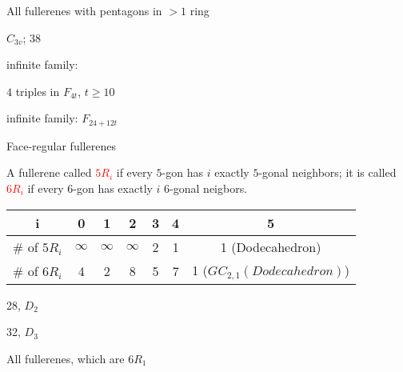 \documentclass[%
pdf,
colorBG,
slideColor,
]{prosper}
\begin{document}
\begin{slide}{All fullerenes with pentagons in $>1$ ring}

\begin{center}
\begin{minipage}{3.5cm}
\centering
{}\par
$C_{3v}$; 38
\end{minipage}
\begin{minipage}{3.5cm}
\centering
{}\par
infinite family:\par
$4$ triples 
in $F_{4t}$, $t\ge 10$
\end{minipage}
\begin{minipage}{3.5cm}
\centering
{}\par
infinite family:
$F_{24+12t}$\par
\end{minipage}
\end{center}

\end{slide}



\begin{slide}{Face-regular fullerenes}

A fullerene called \textcolor{red}{$5R_i$} if every $5$-gon has $i$ 
exactly $5$-gonal 
neighbors; it is called \textcolor{red}{$6R_i$} if every $6$-gon has
exactly $i$ $6$-gonal neigbors.

\begin{center}
\begin{tabular}{|c|c|c|c|c|c|c|}
\hline
i             &0        &1        &2        &3  & 4  &     5\\
\hline
\# of $5R_i$  &$\infty$ &$\infty$ &$\infty$ &2  & 1  &     1 (Dodecahedron)\\
\hline
\# of $6R_i$  &4        &2        &8        &5  & 7  &     1 ($GC_{2,1}(Dodecahedron)$)\\
\hline
\end{tabular}
\end{center}

\begin{center}
\begin{minipage}{5cm}
\centering
{}\par
28, $D_2$
\end{minipage}
\begin{minipage}{5cm}
\centering
{}\par
32, $D_3$
\end{minipage}
\end{center}
\begin{center}
All fullerenes, which are $6R_1$
\end{center}


\end{slide}
\end{document}
